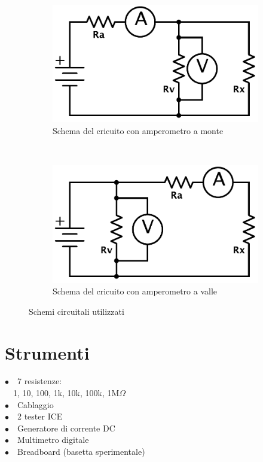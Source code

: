 \begin{figure}
    \begin{subfigure}[h!]{0.3\textwidth}
        \includegraphics[width=\textwidth]{R_monte.pdf}
        \caption{Schema del cricuito con amperometro a monte}
        \label{fig:monte}
    \end{subfigure}%
    ~~ %
    \begin{subfigure}[h!]{0.3\textwidth}
        \includegraphics[width=\textwidth]{R_valle.pdf}
        \caption{Schema del cricuito con amperometro a valle}
        \label{fig:valle}
    \end{subfigure}%
    \caption{Schemi circuitali utilizzati}
    \label{fig:circuiti}
\end{figure}


\section{Strumenti}

$\bullet \quad$7 resistenze:\\
\phantom{x}$\quad$1, 10, 100, 1k, 10k, 100k, 1M$\Omega$\\
$\bullet \quad$Cablaggio\\
$\bullet \quad$2 tester ICE\\
$\bullet \quad$Generatore di corrente DC\\
$\bullet \quad$Multimetro digitale\\
$\bullet \quad$Breadboard (basetta sperimentale)\\